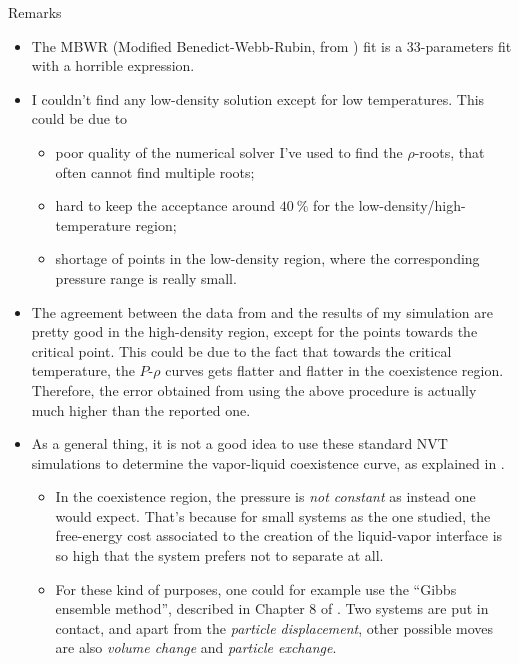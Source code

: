 \documentclass[10pt, compress, protectframetitle, handout]{beamer}
\begin{document}
\begin{frame}[allowframebreaks]{Remarks}

	\begin{itemize}
		\item The MBWR (Modified Benedict-Webb-Rubin, from \cite{Nicolas1979}) fit is a 33-parameters fit with a horrible expression.
		\item I couldn't find any low-density solution except for low temperatures. This could be due to
		\begin{itemize}
			\item poor quality of the numerical solver I've used to find the $\rho$-roots, that often cannot find multiple roots;
			\item hard to keep the acceptance around $\SI{40}{\percent}$ for the low-density/high-temperature region;
			\item shortage of points in the low-density region, where the corresponding pressure range is really small.
		\end{itemize}
		\item The agreement between the data from \cite{Johnson1993} and the results of my simulation are pretty good in the high-density region, except for the points towards the critical point. This could be due to the fact that towards the critical temperature, the $P$-$\rho$ curves gets flatter and flatter in the coexistence region. Therefore, the error obtained from using the above procedure is actually much higher than the reported one.
		\item As a general thing, it is not a good idea to use these standard NVT simulations to determine the vapor-liquid coexistence curve, as explained in \cite{Frenkel2002}.
		\begin{itemize}
			\item In the coexistence region, the pressure is \emph{not constant} as instead one would expect. That's because for small systems as the one studied, the free-energy cost associated to the creation of the liquid-vapor interface is so high that the system prefers not to separate at all.
			\item For these kind of purposes, one could for example use the ``Gibbs ensemble method'', described in Chapter 8 of \cite{Frenkel2002}. Two systems are put in contact, and apart from the \emph{particle displacement}, other possible moves are also \emph{volume change} and \emph{particle exchange}.
		\end{itemize}
	\end{itemize}
	

\end{frame}
\end{document}
